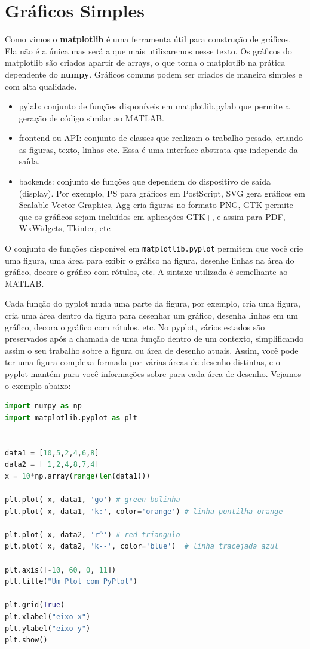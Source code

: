 \section{Gráficos Simples}

Como vimos o {\bf matplotlib} é uma ferramenta útil para construção de gráficos. Ela não é a única mas será a que mais utilizaremos nesse texto. Os gráficos do matplotlib são criados apartir de arrays, o que torna o matplotlib na prática dependente do {\bf numpy}. Gráficos comuns podem ser criados de maneira simples e com alta qualidade. 

\begin{itemize}
    \item pylab: conjunto de funções disponíveis em matplotlib.pylab que permite a geração de código similar ao MATLAB.
    \item frontend ou API: conjunto de classes que realizam o trabalho pesado, criando as figuras, texto, linhas etc. Essa é uma interface abstrata que independe da saída.
    \item backends: conjunto de funções que dependem do dispositivo de saída (display). Por exemplo, PS para gráficos em PostScript, SVG gera gráficos em Scalable Vector Graphics, Agg cria figuras no formato PNG, GTK permite que os gráficos sejam incluídos em aplicações GTK+, e assim para PDF, WxWidgets, Tkinter, etc
\end{itemize}

O conjunto de funções disponível em {\tt matplotlib.pyplot} permitem que você crie uma figura, uma área para exibir o gráfico na figura, desenhe linhas na área do gráfico, decore o gráfico com rótulos, etc. A sintaxe utilizada é semelhante ao MATLAB.

Cada função do pyplot muda uma parte da figura, por exemplo, cria uma figura, cria uma área dentro da figura para desenhar um gráfico, desenha linhas em um gráfico, decora o gráfico com rótulos, etc. No pyplot, vários estados são preservados após a chamada de uma função dentro de um contexto, simplificando assim o seu trabalho sobre a figura ou área de desenho atuais. Assim, você pode ter uma figura complexa formada por várias áreas de desenho distintas, e o pyplot mantém para você informações sobre para cada área de desenho. Vejamos o exemplo abaixo: 

\begin{lstlisting}[language=Python]
import numpy as np
import matplotlib.pyplot as plt


data1 = [10,5,2,4,6,8]
data2 = [ 1,2,4,8,7,4]
x = 10*np.array(range(len(data1)))

plt.plot( x, data1, 'go') # green bolinha
plt.plot( x, data1, 'k:', color='orange') # linha pontilha orange

plt.plot( x, data2, 'r^') # red triangulo
plt.plot( x, data2, 'k--', color='blue')  # linha tracejada azul

plt.axis([-10, 60, 0, 11])
plt.title("Um Plot com PyPlot")

plt.grid(True)
plt.xlabel("eixo x")
plt.ylabel("eixo y")
plt.show()
\end{lstlisting}


